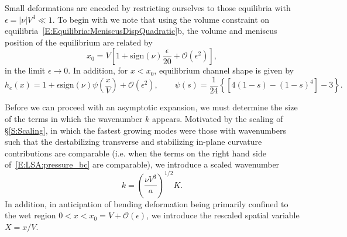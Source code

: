 \documentclass{jfm}
\newcommand{\order}[1]{\mathcal{O}\left(#1\right)}
\begin{document}
Small deformations are encoded by restricting ourselves to those equilibria with $\epsilon  = |\nu| V^4 \ll 1$. To begin with we note that using the volume constraint on equilibria~\eqref{E:Equilibria:MeniscusDispQuadratic}b, the volume and meniscus position of the equilibrium are related by
\begin{equation}\label{E:Asymptotics:EqMeniscusPositionExpansion}
    x_0 = V\left[1 + \mathrm{sign}(\nu) \frac{\epsilon}{20} + \order{\epsilon^2}\right],
\end{equation}
in the limit $\epsilon \to 0$. In addition, for $x < x_0$, equilibrium channel shape is given by
\begin{equation}\label{E:Asymptotics:EqChannelShapeExpansion}
    h_e(x) = 1 + \epsilon \mathrm{sign}(\nu)\psi\left(\frac{x}{V}\right) + \order{\epsilon^2}, \qquad \psi(s) = \frac{1}{24}\left\{\left[4(1-s) - (1-s)^4\right]-3\right\}.
\end{equation}

Before we can proceed with an asymptotic expansion, we must determine the size of the terms in which the wavenumber $k$ appears. Motivated by the scaling of \S\ref{S:Scaling}, in which the fastest growing modes were those with wavenumbers such that the destabilizing transverse and stabilizing in-plane curvature contributions are comparable (i.e. when the terms on the right hand side of~\eqref{E:LSA:pressure_bc} are comparable), we introduce a scaled wavenumber
\begin{equation}\label{E:Asymptotics:RescaledWavenumber}
k = \left(\frac{\nu V^3}{a}\right)^{1/2} K.
\end{equation}
In addition, in anticipation of bending deformation being primarily confined to the wet region $0 < x < x_0 = V + \mathcal{O}(\epsilon)$, we introduce the rescaled spatial variable $X = x/V$. 
\end{document}
